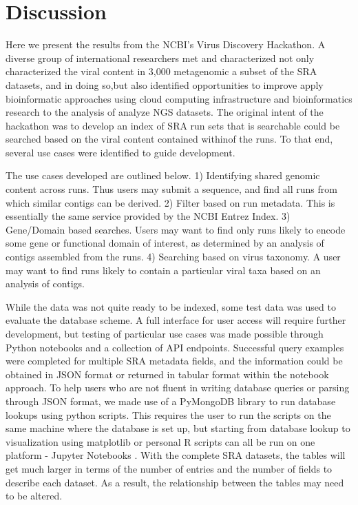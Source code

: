 \section{Discussion}
Here we present the results from the NCBI's Virus Discovery Hackathon. A
diverse group of international researchers met and  characterized not only
characterized the viral content in 3,000 metagenomic a subset of the SRA
datasets, and in doing so,but also identified opportunities to improve apply
bioinformatic approaches using cloud computing infrastructure and
bioinformatics research to the analysis of analyze NGS datasets. The original
intent of the hackathon was to develop an index of SRA run sets that is
searchable could be searched based on the viral content contained withinof the
runs. To that end, several use cases were identified to guide development.

The use cases developed are outlined below. 1) Identifying shared genomic
content across runs. Thus users may submit a sequence, and find all runs from
which similar contigs can be derived. 2) Filter based on run metadata. This is
essentially the same service provided by the NCBI Entrez Index. 3) Gene/Domain
based searches. Users may want to find only runs likely to encode some gene or
functional domain of interest, as determined by an analysis of contigs
assembled from the runs. 4) Searching based on virus taxonomy. A user may want
to find runs likely to contain a particular viral taxa based on an analysis of
contigs.


While the data was not quite ready to be indexed, some test data was used to
evaluate the database scheme. A full interface for user access will require
further development, but testing of particular use cases was made possible
through Python notebooks \cite{jupyterNotebook} and a collection of API
endpoints. Successful query examples were completed for multiple SRA metadata fields, and the information
could be obtained in JSON \cite{rfc_json} format or returned in tabular format
within the notebook approach. To help users who are not fluent in writing database queries
or parsing through JSON format, we made use of a PyMongoDB library to run
database lookups using python scripts. This requires the user to run the
scripts on the same machine where the database is set up, but starting from
database lookup to visualization using matplotlib or personal R scripts can all
be run on one platform - Jupyter Notebooks \cite{jupyterNotebook}. With the
complete SRA datasets, the tables will get much larger in terms of the number
of entries and the number of fields to describe each dataset. As a result, the
relationship between the tables may need to be altered.

